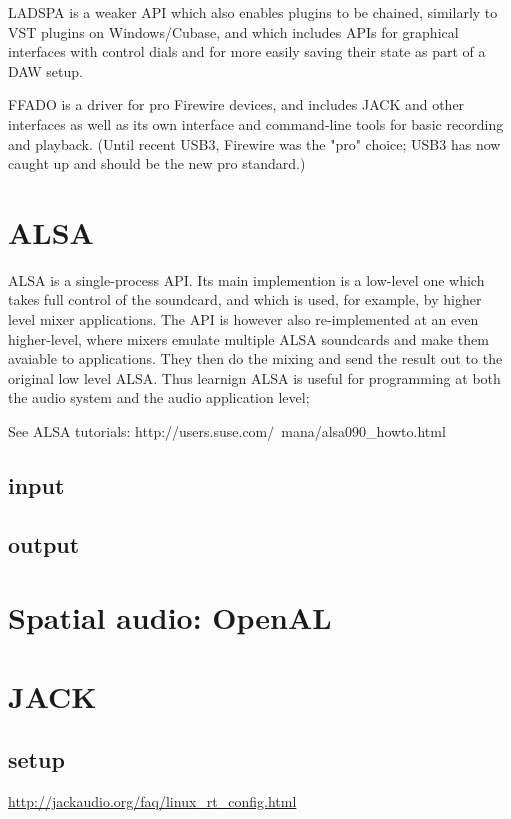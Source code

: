 \documentclass[oneside,english]{scrbook}
\begin{document}
LADSPA is a weaker API which also enables plugins to be chained, similarly to VST plugins on Windows/Cubase, and which includes APIs for graphical interfaces with control dials and for more easily saving their state as part of a DAW setup.

FFADO is a driver for pro Firewire devices, and includes JACK and other interfaces as well as its own interface and command-line tools for basic recording and playback.  (Until recent USB3, Firewire was the "pro" choice; USB3 has now caught up and should be the new pro standard.)


\chapter{ALSA}

ALSA is a single-process API.  Its main implemention is a low-level one which takes full control of the soundcard, and which is used, for example, by higher level mixer applications.  The API is however also re-implemented at an even higher-level, where mixers emulate multiple ALSA soundcards and make them avaiable to applications.  They then do the mixing and send the result out to the original low level ALSA.  Thus learnign ALSA is useful for programming at both the audio system and the audio application level;

See ALSA tutorials:
http://users.suse.com/~mana/alsa090_howto.html

\section{input}


\section{output}


\chapter{Spatial audio: OpenAL}

\chapter{JACK}

\section{setup}
\url{http://jackaudio.org/faq/linux_rt_config.html}
\end{document}
